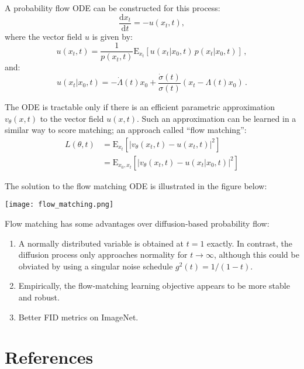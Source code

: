 \documentclass[10pt,letterpaper]{article}
\newcommand{\dd}{\mathrm{d}}
\newcommand{\expectation}[2]{\mathrm{E}_{#1}\!\left[#2\right]}
\begin{document}
A probability flow ODE can be constructed for this process:
\begin{equation}
    \frac{\dd x_t}{\dd t} = -u(x_t, t),
\end{equation}
where the vector field $u$ is given by:
\begin{equation}
    u(x_t, t) = \frac{1}{p(x_t, t)} \expectation{x_t}{u(x_t | x_0, t)\, p(x_t|x_0, t)}\,,
\end{equation}
and:
\begin{equation}
    u(x_t|x_0, t) = - \dot{\Lambda}(t) x_0 + \frac{\dot{\sigma}(t)}{\sigma(t)} (x_t - \Lambda(t) x_0)\,.
\end{equation}

The ODE is tractable only if there is an efficient parametric approximation
$v_\theta(x, t)$ to the vector field $u(x, t)$. Such an approximation can be
learned in a similar way to score matching; an approach called ``flow
matching'':
\begin{align}
    L(\theta, t) &= \expectation{x_t}{\left|v_\theta(x_t, t) - u(x_t, t)\right|^2} \\
    & = \expectation{x_0, x_t}{\left|v_\theta(x_t, t) - u(x_t|x_0, t)\right|^2}
\end{align}

The solution to the flow matching ODE is illustrated in the figure below:
\begin{center}
    \texttt{[image: flow\_matching.png]}
\end{center}

Flow matching has some advantages over diffusion-based probability flow:
\begin{enumerate}
    \item A normally distributed variable is obtained at $t = 1$ exactly. In
        contrast, the diffusion process only approaches normality for $t \to
        \infty$, although this could be obviated by using a singular noise
        schedule $g^2(t) = 1/(1-t)$.
    \item Empirically, the flow-matching learning objective appears to be more
        stable and robust.
    \item Better FID metrics on ImageNet.
\end{enumerate}

\section{References}
\end{document}
